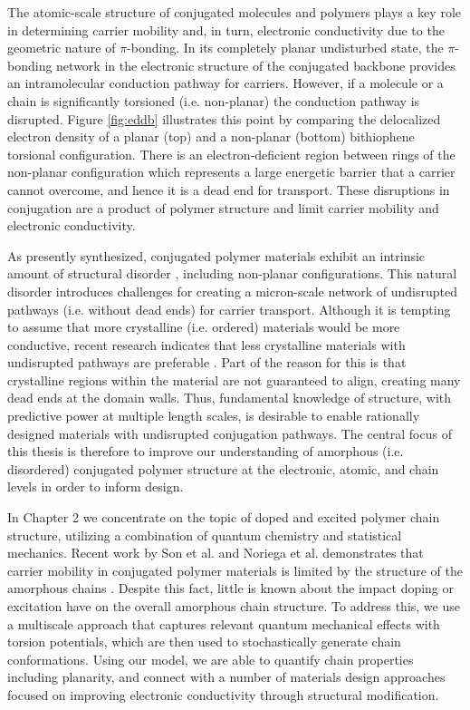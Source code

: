 The atomic-scale structure of conjugated molecules and polymers plays a key role in determining carrier mobility and, in turn, electronic conductivity due to the geometric nature of $\pi$-bonding. In its completely planar undisturbed state, the $\pi$-bonding network in the electronic structure of the conjugated backbone provides an intramolecular conduction pathway for carriers. However, if a molecule or a chain is significantly torsioned (i.e. non-planar) the conduction pathway is disrupted. Figure \ref{fig:eddb} illustrates this point by comparing the delocalized electron density of a planar (top) and a non-planar (bottom) bithiophene torsional configuration. There is an electron-deficient region between rings of the non-planar configuration which represents a large energetic barrier that a carrier cannot overcome, and hence it is a dead end for transport. These disruptions in conjugation are a product of polymer structure and limit carrier mobility and electronic conductivity.

As presently synthesized, conjugated polymer materials exhibit an intrinsic amount of structural disorder \cite{Noriega2013, Shen2016}, including non-planar configurations. This natural disorder introduces challenges for creating a micron-scale network of undisrupted pathways (i.e. without dead ends) for carrier transport. Although it is tempting to assume that more crystalline (i.e. ordered) materials would be more conductive, recent research indicates that less crystalline materials with undisrupted pathways are preferable \cite{Noriega2013, Son2016}. Part of the reason for this is that crystalline regions within the material are not guaranteed to align, creating many dead ends at the domain walls. Thus, fundamental knowledge of structure, with predictive power at multiple length scales, is desirable to enable rationally designed materials with undisrupted conjugation pathways. The central focus of this thesis is therefore to improve our understanding of amorphous (i.e. disordered) conjugated polymer structure at the electronic, atomic, and chain levels in order to inform design.

In Chapter 2 we concentrate on the topic of doped and excited polymer chain structure, utilizing a combination of quantum chemistry and statistical mechanics. Recent work by Son et al. and Noriega et al. demonstrates that carrier mobility in conjugated polymer materials is limited by the structure of the amorphous chains \cite{Noriega2013, Son2016}. Despite this fact, little is known about the impact doping or excitation have on the overall amorphous chain structure. To address this, we use a multiscale approach that captures relevant quantum mechanical effects with torsion potentials, which are then used to stochastically generate chain conformations. Using our model, we are able to quantify chain properties including planarity, and connect with a number of materials design approaches focused on improving electronic conductivity through structural modification.

